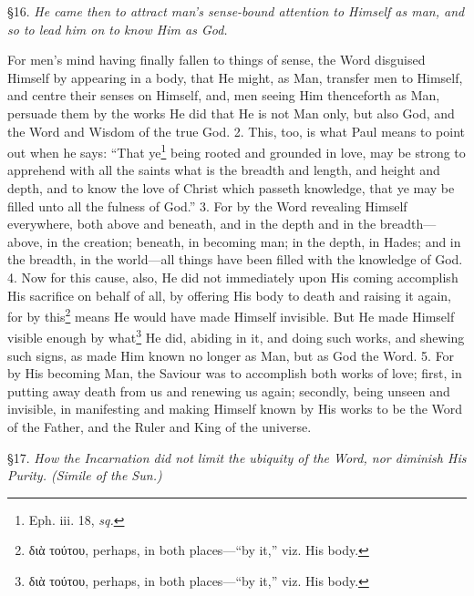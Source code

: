§16. \emph{He came then to attract man’s sense-bound attention to Himself as man, and so to lead him on to know Him as God.}

For men’s mind having finally fallen to things of sense, the Word disguised Himself by appearing in a body, that He might, as Man, transfer men to Himself, and centre their senses on Himself, and, men seeing Him thenceforth as Man, persuade them by the works He did that He is not Man only, but also God, and the Word and Wisdom of the true God. 2. This, too, is what Paul means to point out when he says: “That ye\footnote{Eph. iii. 18, \emph{sq.}} being rooted and grounded in love, may be strong to apprehend with all the saints what is the breadth and length, and height and depth, and to know the love of Christ which passeth knowledge, that ye may be filled unto all the fulness of God.” 3. For by the Word revealing Himself everywhere, both above and beneath, and in the depth and in the breadth—above, in the creation; beneath, in becoming man; in the depth, in Hades; and in the breadth, in the world—all things have been filled with the knowledge of God. 4. Now for this cause, also, He did not immediately upon His coming accomplish His sacrifice on behalf of all, by offering His body to death and raising it again, for by this\footnote{\textgreek{διὰ τούτου}, perhaps, in both places—“by it,” viz. His body.} means He would have made Himself invisible. But He made Himself visible enough by what\footnote{\textgreek{διὰ τούτου}, perhaps, in both places—“by it,” viz. His body.} He did, abiding in it, and doing such works, and shewing such signs, as made Him known no longer as Man, but as God the Word. 5. For by His becoming Man, the Saviour was to accomplish both works of love; first, in putting away death from us and renewing us again; secondly, being unseen and invisible, in manifesting and making Himself known by His works to be the Word of the Father, and the Ruler and King of the universe.


§17. \emph{How the Incarnation did not limit the ubiquity of the Word, nor diminish His Purity. (Simile of the Sun.)}

